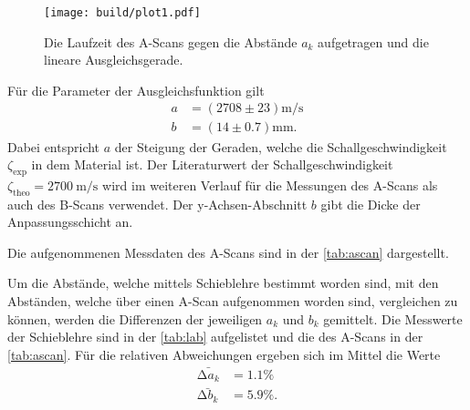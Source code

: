 \begin{figure}[H]
	\texttt{[image: build/plot1.pdf]}
	\captionsetup{width=0.765\linewidth}
	\caption{Die Laufzeit des A-Scans gegen die Abstände $a_k$ aufgetragen und die lineare Ausgleichsgerade.}
	\label{fig:plot1}
\end{figure}

Für die Parameter der Ausgleichsfunktion gilt
\begin{align*}
    a &= \left(2708 \pm 23\right) \si{\meter \per \second}\\
    b &= \left(14 \pm 0.7\right) \si{\milli\meter}.
\end{align*}
Dabei entspricht $a$ der Steigung der Geraden, welche die Schallgeschwindigkeit $\zeta_{\text{exp}}$ in dem Material ist.
Der Literaturwert der Schallgeschwindigkeit $\zeta_{\text{theo}} = \SI{2700}{\meter\per\second}$ \cite{doppler} wird im weiteren Verlauf für die 
Messungen des A-Scans als auch des B-Scans verwendet.
Der y-Achsen-Abschnitt $b$ gibt die Dicke der Anpassungsschicht an. 

Die aufgenommenen Messdaten des A-Scans sind in der \autoref{tab:ascan} dargestellt.
\begin{table}[H]
    \centering
    \caption{Messwerte des A-Scan.}
	
    \label{tab:ascan}
\end{table}

Um die Abstände, welche mittels Schieblehre bestimmt worden sind, mit den Abständen, welche über einen A-Scan aufgenommen worden sind,
vergleichen zu können, werden die Differenzen der jeweiligen $a_k$ und $b_k$ gemittelt.
Die Messwerte der Schieblehre sind in der \autoref{tab:lab} aufgelistet und die des A-Scans in der \autoref{tab:ascan}.
Für die relativen Abweichungen ergeben sich im Mittel die Werte
\begin{align*}
\bar{\increment a_k} &= 1.1\% \\
\bar{\increment b_k} &= 5.9\%.
\end{align*}

